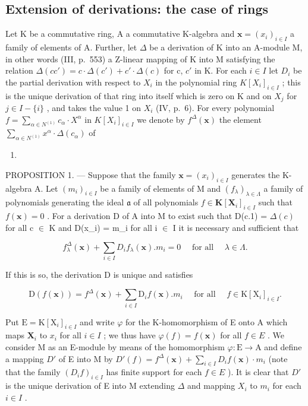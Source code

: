 \subsection{Extension of derivations: the case of rings}

Let K be a commutative ring, A a commutative K-algebra and \(\mathbf{x} = (x_i)_{i \in I}\) a family of elements of A. Further, let \(\Delta\) be a derivation of K into an A-module M, in other words (III, p.~553) a Z-linear mapping of K into M satisfying the relation \(\Delta(cc') = c \cdot \Delta(c') + c' \cdot \Delta(c)\) for c, \(c'\) in K. For each \(i \in I\) let \(D_i\) be the partial derivation with respect to \(X_i\) in the polynomial ring \(K[X_i]_{i \in I}\) ; this is the unique derivation of that ring into itself which is zero on K and on \(X_j\) for \(j \in I - \{i\}\) , and takes the value 1 on \(X_i\) (IV, p.~6). For every polynomial \(f = \sum_{\alpha \in N^{(1)}} c_\alpha \cdot X^\alpha\) in \(K[X_i]_{i \in I}\) we denote by \(f^\Delta(\mathbf{x})\) the element \(\sum_{\alpha \in N^{(1)}} x^\alpha \cdot \Delta(c_\alpha)\) of

\begin{enumerate}
\def\labelenumi{\Alph{enumi}.}
\setcounter{enumi}{12}
\tightlist
\item
\end{enumerate}

PROPOSITION 1. --- Suppose that the family \(\mathbf{x} = (x_i)_{i \in I}\) generates the K-algebra A. Let \((m_i)_{i \in I}\) be a family of elements of M and \((f_\lambda)_{\lambda \in \Lambda}\) a family of polynomials generating the ideal \(\mathfrak{a}\) of all polynomials \(f \in \mathbf{K}[\mathbf{X}_i]_{i \in I}\) such that \(f(\mathbf{x}) = 0\) . For a derivation D of A into M to exist such that D(c.1) = \(\Delta(c)\) for all c \(\in\) K and D(x\_i) = m\_i for all i \(\in\) I it is necessary and sufficient that

\[
f _ {\lambda} ^ {\Delta} (\mathbf {x}) + \sum_ {i \in I} D _ {i} f _ {\lambda} (\mathbf {x}). m _ {i} = 0 \quad \text { for   all } \quad \lambda \in \Lambda .\tag{1}
\]

If this is so, the derivation D is unique and satisfies

\[
\mathrm{D} (f (\mathbf {x})) = f ^ {\Delta} (\mathbf {x}) + \sum_ {i \in I} \mathrm{D} _ {i} f (\mathbf {x}). m _ {i} \quad \text { for   all } \quad f \in \mathrm{K} [ \mathrm{X} _ {i} ] _ {i \in I}.\tag{2}
\]

Put \(\mathrm{E} = \mathrm{K}[\mathrm{X}_i]_{i \in I}\) and write \(\varphi\) for the K-homomorphism of E onto A which maps \(\mathbf{X}_i\) to \(x_i\) for all \(i \in I\) ; we thus have \(\varphi(f) = f(\mathbf{x})\) for all \(f \in E\) . We consider M as an E-module by means of the homomorphism \(\varphi: \mathrm{E} \to \mathrm{A}\) and define a mapping \(D'\) of E into M by \(D'(f) = f^{\Delta}(\mathbf{x}) + \sum_{i \in I} D_i f(\mathbf{x}) \cdot m_i\) (note that the family \((D_i f)_{i \in I}\) has finite support for each \(f \in E\) ). It is clear that \(D'\) is the unique derivation of E into M extending \(\Delta\) and mapping \(X_i\) to \(m_i\) for each \(i \in I\) .

